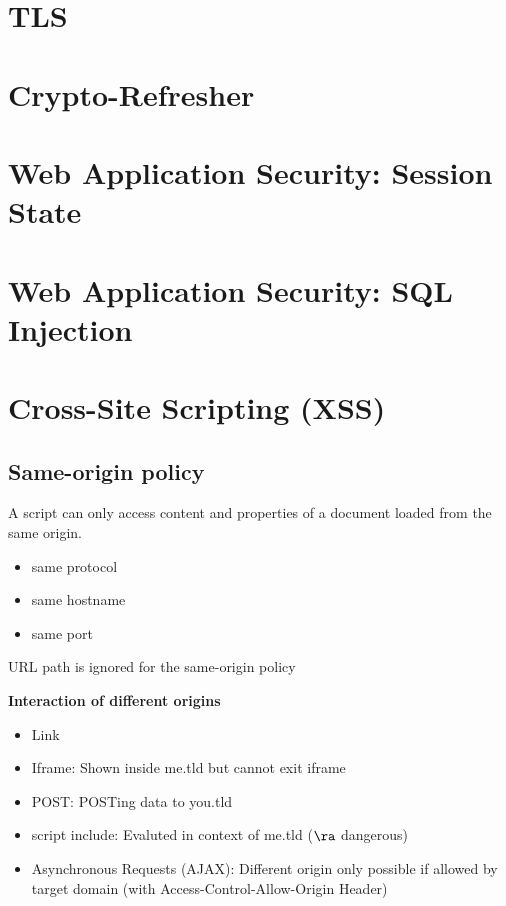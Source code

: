 \documentclass[fs, footer]{latex4ei}
\begin{document}
\begin{multicols*}{4}

\section{TLS}

\section{Crypto-Refresher}

\section{Web Application Security: Session State}

\section{Web Application Security: SQL Injection}

\section{Cross-Site Scripting (XSS)}
\subsection{Same-origin policy}
A script can only access content and properties of a document loaded from the same origin.
\begin{itemize}
  \item same protocol
  \item same hostname
  \item same port
\end{itemize}
URL path is ignored for the same-origin policy

\textbf{Interaction of different origins}
\begin{itemize}
  \item Link
  \item Iframe: Shown inside me.tld but cannot exit iframe
  \item POST: POSTing data to you.tld
  \item script include: Evaluted in context of me.tld ($\ra$ dangerous)
  \item Asynchronous Requests (AJAX): Different origin only possible if allowed by target domain (with Access-Control-Allow-Origin Header)
\end{itemize}


\end{multicols*}
\end{document}
